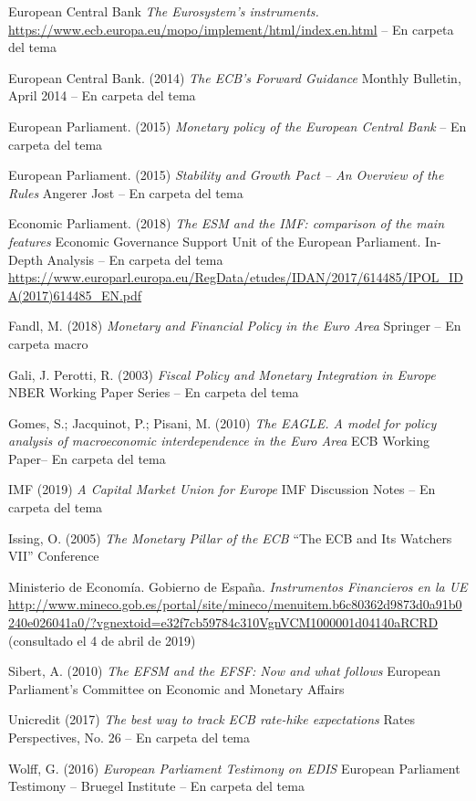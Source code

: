 \documentclass{nuevotema}
\begin{document}
European Central Bank \textit{The Eurosystem's instruments.} \url{https://www.ecb.europa.eu/mopo/implement/html/index.en.html} -- En carpeta del tema

European Central Bank. (2014) \textit{The ECB's Forward Guidance} Monthly Bulletin, April 2014 -- En carpeta del tema

European Parliament. (2015) \textit{Monetary policy of the European Central Bank}  -- En carpeta del tema

European Parliament. (2015) \textit{Stability and Growth Pact -- An Overview of the Rules} Angerer Jost -- En carpeta del tema

Economic Parliament. (2018) \textit{The ESM and the IMF: comparison of the main features} Economic Governance Support Unit of the European Parliament. In-Depth Analysis -- En carpeta del tema \url{https://www.europarl.europa.eu/RegData/etudes/IDAN/2017/614485/IPOL_IDA(2017)614485_EN.pdf}

Fandl, M. (2018) \textit{Monetary and Financial Policy in the Euro Area}  Springer -- En carpeta macro

Gali, J. Perotti, R. (2003) \textit{Fiscal Policy and Monetary Integration in Europe}  NBER Working Paper Series -- En carpeta del tema

Gomes, S.; Jacquinot, P.; Pisani, M. (2010) \textit{The EAGLE. A model for policy analysis of macroeconomic interdependence in the Euro Area} ECB Working Paper-- En carpeta del tema

IMF (2019) \textit{A Capital Market Union for Europe} IMF Discussion Notes -- En carpeta del tema

Issing, O. (2005) \textit{The Monetary Pillar of the ECB}  ``The ECB and Its Watchers VII'' Conference 

Ministerio de Economía. Gobierno de España. \textit{Instrumentos Financieros en la UE} \url{http://www.mineco.gob.es/portal/site/mineco/menuitem.b6c80362d9873d0a91b0240e026041a0/?vgnextoid=e32f7cb59784c310VgnVCM1000001d04140aRCRD} (consultado el 4 de abril de 2019)

Sibert, A. (2010) \textit{The EFSM and the EFSF: Now and what follows}  European Parliament's Committee on Economic and Monetary Affairs

Unicredit (2017) \textit{The best way to track ECB rate-hike expectations} Rates Perspectives, No. 26 -- En carpeta del tema

Wolff, G. (2016) \textit{European Parliament Testimony on EDIS}  European Parliament Testimony -- Bruegel Institute -- En carpeta del tema
\end{document}
